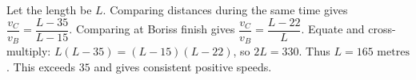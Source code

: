 Let the length be $L$. Comparing distances during the same time gives $\dfrac{v_C}{v_B}=\dfrac{L-35}{L-15}$. Comparing at Boris\textquotesingle s finish gives $\dfrac{v_C}{v_B}=\dfrac{L-22}{L}$. Equate and cross-multiply: $L(L-35)=(L-15)(L-22)$, so $2L=330$. Thus $\boxed{L=165\text{ metres}}$. This exceeds $35$ and gives consistent positive speeds.
